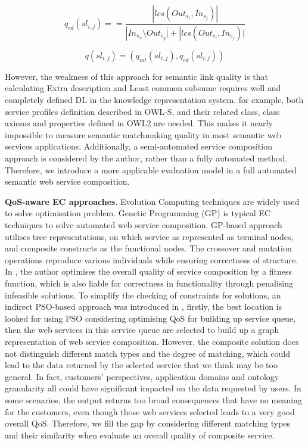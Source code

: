 \documentclass{llncs}
\begin{document}
\begin{equation}
q_{cd}(sl{_{i,j}})={=} \frac{|lcs(Out_{s_i},In_{s_j})|}{|In_{s_{x}} \setminus Out_{s{_y}} \stackrel{.}| +|lcs(Out_{s_i},In_{s_j})| }
 \label{equation2}
\end{equation}

\begin{equation}
\label{equation3}
q(sl{_{i,j}}) \stackrel{.}{=} (q_{mt}(sl_{i,j}), q_{cd}(sl_{i,j}))
\end{equation}

However, the weakness of this approach for semantic link quality is that calculating Extra description and Least common subsume requires well and completely defined DL in the knowledge representation system. for example, both service profiles definition described in OWL-S, and their related class, class axioms and properties defined in OWL2 are needed. This makes it nearly impossible to measure semantic matchmaking quality in most semantic web services applications. Additionally, a semi-automated service composition approach is considered by the author, rather than a fully automated method. Therefore, we introduce a more applicable evaluation model in a full automated semantic web service composition.

\textbf{QoS-aware EC approaches}. Evolution Computing techniques are widely used to solve optimisation problem. Genetic Programming (GP) \cite{da2015graphevol,da2016particle} is typical EC techniques to solve automated web service composition. GP-based approach utilises tree representations, on which service as represented as terminal nodes, and composite constructs as the functional nodes. The crossover and mutation operations reproduce various individuals while ensuring correctness of structure. In \cite{yu2013adaptive}, the author optimises the overall quality of service composition by a fitness function, which is also liable for correctness in functionality through penalising infeasible solutions. To simplify the checking of constraints for solutions, an indirect PSO-based approach was introduced in \cite{da2016particle}, firstly, the best location is looked for using PSO considering optimising QoS for building up service queue, then the web services in this service queue are selected to build up a graph representation of web service composition. However, the composite solution does not distinguish different match types and the degree of matching, which could lead to the data returned by the selected service that we think may be too general. In fact, customers' perspectives, application domains and ontology granularity all could have significant impacted on the data requested by users. In some scenarios, the output returns too broad consequences that have no meaning for the customers, even though those web services selected leads to a very good overall QoS. Therefore, we fill the gap by considering different matching types and their similarity when evaluate an overall quality of composite service.
\end{document}
